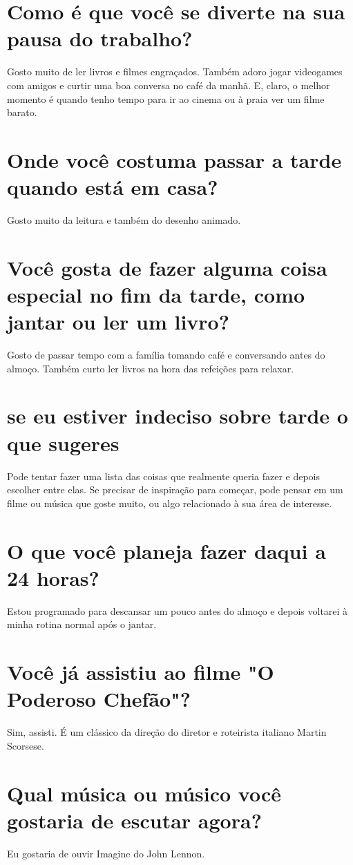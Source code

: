 \documentclass[11pt,a4paper]{article}
\begin{document}
\section{Como é que você se diverte na sua pausa do trabalho?}
Gosto muito de ler livros e filmes engraçados. Também adoro jogar videogames com amigos e curtir uma boa conversa no café da manhã. E, claro, o melhor momento é quando tenho tempo para ir ao cinema ou à praia ver um filme barato.

\section{Onde você costuma passar a tarde quando está em casa?}
Gosto muito da leitura e também do desenho animado.

\section{Você gosta de fazer alguma coisa especial no fim da tarde, como jantar ou ler um livro?}
Gosto de passar tempo com a família tomando café e conversando antes do almoço. Também curto ler livros na hora das refeições para relaxar.

\section{se eu estiver indeciso sobre tarde o que sugeres}
Pode tentar fazer uma lista das coisas que realmente queria fazer e depois escolher entre elas. Se precisar de inspiração para começar, pode pensar em um filme ou música que goste muito, ou algo relacionado à sua área de interesse.

\section{O que você planeja fazer daqui a 24 horas?}
Estou programado para descansar um pouco antes do almoço e depois voltarei à minha rotina normal após o jantar.

\section{Você já assistiu ao filme "O Poderoso Chefão"?}
Sim, assisti. É um clássico da direção do diretor e roteirista italiano Martin Scorsese.

\section{Qual música ou músico você gostaria de escutar agora?}
Eu gostaria de ouvir Imagine do John Lennon.
\end{document}
